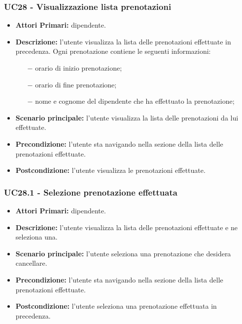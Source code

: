 \subsubsection{ UC28 - Visualizzazione lista prenotazioni}
\begin{itemize}
	\item\textbf{Attori Primari:} dipendente.
	\item\textbf{Descrizione:} l'utente visualizza la lista delle prenotazioni effettuate in precedenza. Ogni prenotazione contiene le seguenti informazioni:
	\begin{itemize}
		\item[$-$] orario di inizio prenotazione;
		\item[$-$] orario di fine prenotazione;
		\item[$-$] nome e cognome del dipendente che ha effettuato la prenotazione;
	\end{itemize}
	\item\textbf{Scenario principale:} l’utente visualizza la lista delle prenotazioni da lui effettuate.
	\item\textbf{Precondizione:} l'utente sta navigando nella sezione della lista delle prenotazioni effettuate.
	\item\textbf{Postcondizione:} l’utente visualizza le prenotazioni effettuate.
\end{itemize}

\subsubsection{ UC28.1 - Selezione prenotazione effettuata}
\begin{itemize}
	\item\textbf{Attori Primari:} dipendente.
	\item\textbf{Descrizione:} l’utente visualizza la lista delle prenotazioni effettuate e ne seleziona una.
	\item\textbf{Scenario principale:} l’utente seleziona una prenotazione che desidera cancellare.
	\item\textbf{Precondizione:} l'utente sta navigando nella sezione della lista delle prenotazioni effettuate.
	\item\textbf{Postcondizione:} l’utente seleziona una prenotazione effettuata in precedenza.
\end{itemize}

